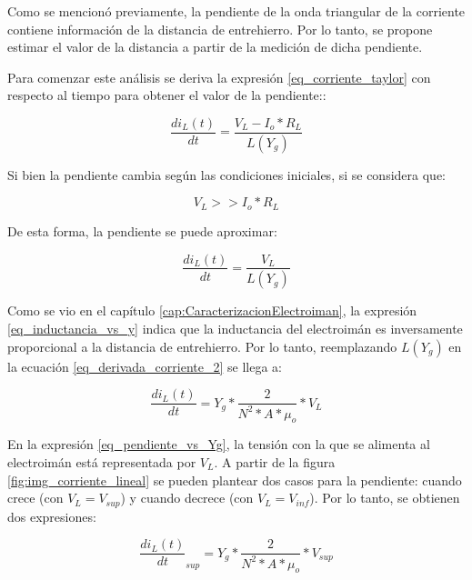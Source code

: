 Como se mencionó previamente, la pendiente de la onda triangular de la corriente contiene información de la distancia de entrehierro. Por lo tanto, se propone estimar el valor de la distancia a partir de la medición de dicha pendiente. 

Para comenzar este análisis se deriva la expresión \ref{eq_corriente_taylor} con respecto al tiempo para obtener el valor de la pendiente::


\begin{equation} \label{eq_derivada_corriente}
	\frac{di_L(t)}{dt}=\frac{V_L-I_o*R_L}{L(Y_g)}
\end{equation}

Si bien la pendiente cambia según las condiciones iniciales, si se considera que:

\begin{equation} \label{eq_Derivadadi-dt}
	V_{L}>>I_o*R_L
\end{equation}

De esta forma, la pendiente se puede aproximar:

\begin{equation} \label{eq_derivada_corriente_2}
	\frac{di_L(t)}{dt}= \frac{V_L}{L(Y_g)}
\end{equation}


Como se vio en el capítulo \ref{cap:CaracterizacionElectroiman}, la expresión \ref{eq_inductancia_vs_y} indica que la inductancia del electroimán es inversamente proporcional a la distancia de entrehierro. Por lo tanto, reemplazando $L(Y_g)$ en la ecuación \ref{eq_derivada_corriente_2} se llega a:

\begin{equation}\label{eq_pendiente_vs_Yg}
	\frac{di_L(t)}{dt}= Y_g*\frac{2}{N^2*A*\mu_o}*V_L
\end{equation}

En la expresión \ref{eq_pendiente_vs_Yg}, la tensión con la que se alimenta al electroimán está representada por $V_L$. A partir de la figura \ref{fig:img_corriente_lineal} se pueden plantear dos casos para la pendiente: cuando crece (con $V_L=V_{sup}$) y cuando decrece (con $V_L=V_{inf}$). Por lo tanto, se obtienen dos expresiones:

\begin{equation} 
	\frac{di_L(t)}{dt}_{sup}= Y_g*\frac{2}{N^2*A*\mu_o}*V_{sup}
\end{equation}


